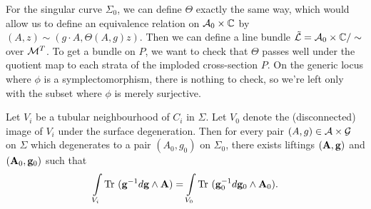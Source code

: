 	
	For the singular curve $\Sigma_0$, we can define $\Theta$ exactly the same way, which would allow us to define an equivalence relation on $\mathcal{A}_0\times \mathbb{C}$ by $(A,z)\sim (g\cdot A, \Theta(A,g)z)$. Then we can define a line bundle $\tilde{\mathcal{L}} = \mathcal{A}_0 \times \mathbb{C}/\sim$ over $\mathcal{M}^T$. To get a bundle on $P$, we want to check that $\Theta$ passes well under the quotient map to each strata of the imploded cross-section $P$. On the generic locus where $\phi$ is a symplectomorphism, there is nothing to check, so we're left only with the subset where $\phi$ is merely surjective. 
	\begin{lemma}
		Let $V_i$ be a tubular neighbourhood of $C_i$ in $\Sigma$. Let $V_{0}$ denote the (disconnected) image of $V_i$ under the surface degeneration. Then for every pair $(A,g)\in\mathcal{A}\times \mathcal{G}$ on $\Sigma$ which degenerates to a pair $(A_0, g_0)$ on $\Sigma_0$, there exists liftings $(\mathbf{A},\mathbf{g})$ and $(\mathbf{A}_0,\mathbf{g}_0)$ such that
		\begin{equation}
			\int\limits_{V_i} \text{Tr }(\mathbf{g}^{-1}d\mathbf{g}\wedge \mathbf{A}) = \int\limits_{V_0} \text{Tr }(\mathbf{g}_0^{-1}d\mathbf{g}_0\wedge \mathbf{A}_0).
		\end{equation}
		\label{l:main-lemma}
	\end{lemma}
